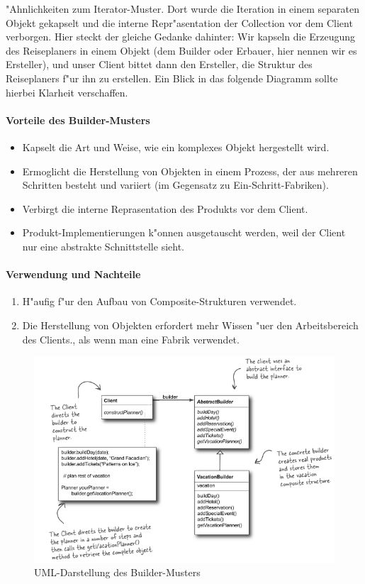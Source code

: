 "Ahnlichkeiten zum Iterator-Muster. Dort wurde die Iteration in einem separaten Objekt gekapselt und die interne Repr"asentation der Collection vor dem Client verborgen. Hier steckt der gleiche Gedanke dahinter: Wir kapseln die Erzeugung des Reiseplaners in einem Objekt (dem Builder oder Erbauer, hier nennen wir es Ersteller), und unser Client bittet dann den Ersteller, die Struktur des Reiseplaners f"ur ihn zu erstellen. Ein Blick in das folgende Diagramm sollte hierbei Klarheit verschaffen. 

\paragraph{Vorteile des Builder-Musters}
\begin{itemize}
	\item Kapselt die Art und Weise, wie ein komplexes Objekt hergestellt wird.
	\item Ermoglicht die Herstellung von Objekten in einem Prozess, der aus mehreren Schritten besteht und variiert (im Gegensatz zu Ein-Schritt-Fabriken).
	\item Verbirgt die interne Reprasentation des Produkts vor dem Client. 
	\item Produkt-Implementierungen k"onnen ausgetauscht werden, weil der Client nur eine abstrakte Schnittstelle sieht. 
\end{itemize}

\paragraph{Verwendung und Nachteile}
\begin{enumerate}
	\item H"aufig f"ur den Aufbau von Composite-Strukturen verwendet. 
	\item Die Herstellung von Objekten erfordert mehr Wissen "uer den Arbeitsbereich des Clients., als wenn man eine Fabrik verwendet.
\end{enumerate}

\begin{figure} [!htb]
	\centering
	\includegraphics[width=.9\linewidth]{builder/img/builderUML}
	\caption{UML-Darstellung des Builder-Musters}
	\label{fig:builder}
\end{figure}